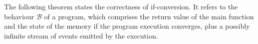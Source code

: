 

The following theorem states the correctness of if-conversion. It refers to the
behaviour $\mathcal{B}$ of a program, which comprises the return value of the
main function and the state of the memory if the program execution converges,
plus a possibly infinite stream of events emitted by the execution.

